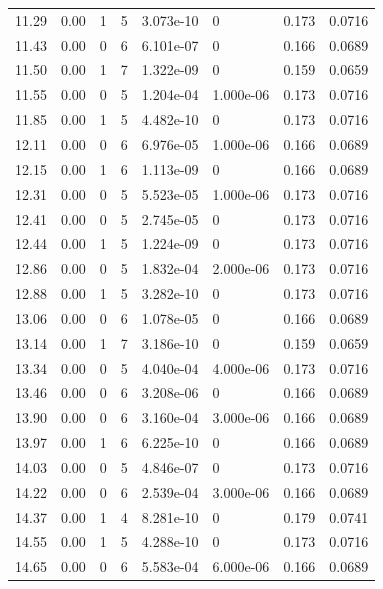\documentclass[preview]{standalone}
\begin{document}
{{{\begin{tabular}{L{1.2cm}C{1.2cm} C{0.3cm}C{0.5cm} C{1.4cm}C{1.4cm} C{1.4cm}C{1.4cm}}
  11.29  &  0.00  & 1     &  5 &  3.073e-10  & 0  & 0.173 &  0.0716   \\ 
  11.43  &  0.00  & 0     &  6 &  6.101e-07  & 0  & 0.166 &  0.0689   \\ 
  11.50  &  0.00  & 1     &  7 &  1.322e-09  & 0  & 0.159 &  0.0659   \\ 
  11.55  &  0.00  & 0     &  5 &  1.204e-04  & 1.000e-06  & 0.173 &  0.0716   \\ 
  11.85  &  0.00  & 1     &  5 &  4.482e-10  & 0  & 0.173 &  0.0716   \\ 
  12.11  &  0.00  & 0     &  6 &  6.976e-05  & 1.000e-06  & 0.166 &  0.0689   \\ 
  12.15  &  0.00  & 1     &  6 &  1.113e-09  & 0  & 0.166 &  0.0689   \\ 
  12.31  &  0.00  & 0     &  5 &  5.523e-05  & 1.000e-06  & 0.173 &  0.0716   \\ 
  12.41  &  0.00  & 0     &  5 &  2.745e-05  & 0  & 0.173 &  0.0716   \\ 
  12.44  &  0.00  & 1     &  5 &  1.224e-09  & 0  & 0.173 &  0.0716   \\ 
  12.86  &  0.00  & 0     &  5 &  1.832e-04  & 2.000e-06  & 0.173 &  0.0716   \\ 
  12.88  &  0.00  & 1     &  5 &  3.282e-10  & 0  & 0.173 &  0.0716   \\ 
  13.06  &  0.00  & 0     &  6 &  1.078e-05  & 0  & 0.166 &  0.0689   \\ 
  13.14  &  0.00  & 1     &  7 &  3.186e-10  & 0  & 0.159 &  0.0659   \\ 
  13.34  &  0.00  & 0     &  5 &  4.040e-04  & 4.000e-06  & 0.173 &  0.0716   \\ 
  13.46  &  0.00  & 0     &  6 &  3.208e-06  & 0  & 0.166 &  0.0689   \\ 
  13.90  &  0.00  & 0     &  6 &  3.160e-04  & 3.000e-06  & 0.166 &  0.0689   \\ 
  13.97  &  0.00  & 1     &  6 &  6.225e-10  & 0  & 0.166 &  0.0689   \\ 
  14.03  &  0.00  & 0     &  5 &  4.846e-07  & 0  & 0.173 &  0.0716   \\ 
  14.22  &  0.00  & 0     &  6 &  2.539e-04  & 3.000e-06  & 0.166 &  0.0689   \\ 
  14.37  &  0.00  & 1     &  4 &  8.281e-10  & 0  & 0.179 &  0.0741   \\ 
  14.55  &  0.00  & 1     &  5 &  4.288e-10  & 0  & 0.173 &  0.0716   \\ 
  14.65  &  0.00  & 0     &  6 &  5.583e-04  & 6.000e-06  & 0.166 &  0.0689   \\ 

\end{tabular}}}}
\end{document}
